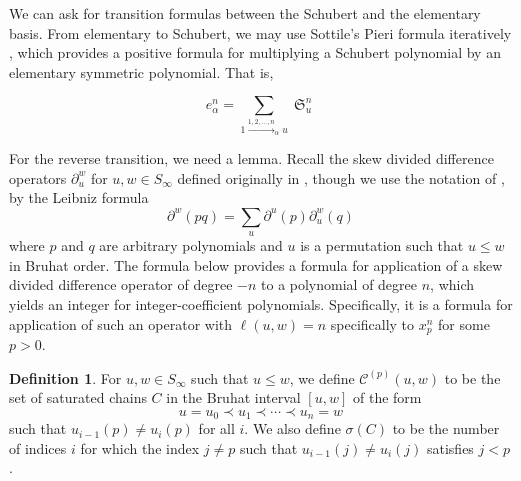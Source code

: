 \documentclass{amsart}
\theoremstyle{definition}
\newtheorem{definition}[lemma]{Definition}
\theoremstyle{remark}
\numberwithin{equation}{subsection}
\DeclareMathOperator{\sch}{\mathfrak{S}}
\begin{document}
We can ask for transition formulas between the Schubert and the elementary basis. From elementary to Schubert, we may use Sottile's Pieri formula iteratively \cite{sottile}, which provides a positive formula for multiplying a Schubert polynomial by an elementary symmetric polynomial. That is,

$$e_{\alpha}^n = \sum_{1\xrightarrow{1,2,\ldots,n}_{\alpha} u}\sch_u^n$$

For the reverse transition, we need a lemma. Recall the skew divided difference operators $\partial_u^w$ for $u,w\in S_\infty$ defined originally in \cite{notes}, though we use the notation of \cite{samuelleibniz}, by the Leibniz formula
$$\partial^w(pq) = \sum_{u} \partial^u(p)\partial_u^w(q)$$
where $p$ and $q$ are arbitrary polynomials and $u$ is a permutation such that $u\leq w$ in Bruhat order. The formula below provides a formula for application of a skew divided difference operator of degree $-n$ to a polynomial of degree $n$, which yields an integer for integer-coefficient polynomials. Specifically, it is a formula for application of such an operator with $\ell(u,w)=n$ specifically to $x_p^n$ for some $p>0$.

\newcommand{\achain}[1]{\mathcal{C}^{(#1)}}
\begin{definition}
For $u,w\in S_\infty$ such that $u\leq w$, we define $\achain{p}(u,w)$ to be the set of saturated chains $C$ in the Bruhat interval $[u,w]$ of the form
$$u=u_0\prec u_1\prec \cdots \prec u_n=w$$  
such that $u_{i-1}(p)\neq u_i(p)$ for all $i$. We also define $\sigma(C)$ to be the number of indices $i$ for which the index $j\neq p$ such that $u_{i-1}(j)\neq u_i(j)$ satisfies $j<p$.
\end{definition}
\end{document}
